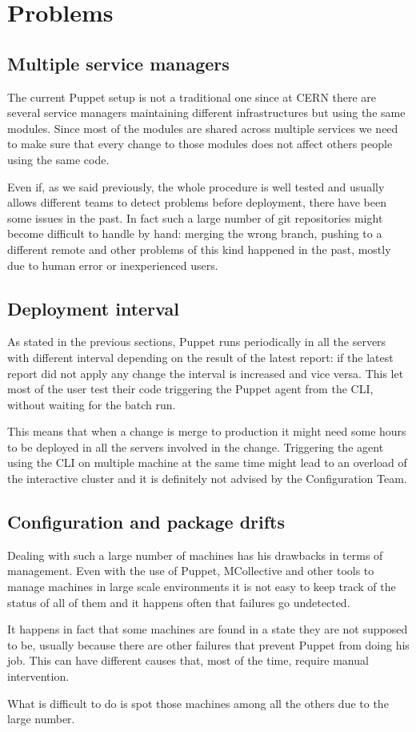 \section{Problems}

\subsection{Multiple service managers}

The current Puppet setup is not a traditional one since at CERN there are
several service managers maintaining different infrastructures but using
the same modules. Since most of the modules are shared across multiple
services we need to make sure that every change to those modules does not
affect others people using the same code.

Even if, as we said previously, the whole procedure is well tested and
usually allows different teams to detect problems before deployment, there
have been some issues in the past. In fact such a large number of git
repositories might become difficult to handle by hand: merging the wrong
branch, pushing to a different remote and other problems of this kind
happened in the past, mostly due to human error or inexperienced users.

\subsection{Deployment interval}

As stated in the previous sections, Puppet runs periodically in all the
servers with different interval depending on the result of the latest
report: if the latest report did not apply any change the interval is
increased and vice versa. This let most of the user test their code
triggering the Puppet agent from the CLI, without waiting for the batch
run.

This means that when a change is merge to production it might need some
hours to be deployed in all the servers involved in the change. Triggering
the agent using the CLI on multiple machine at the same time might lead to
an overload of the interactive cluster and it is definitely not advised
by the Configuration Team.

\subsection{Configuration and package drifts}

Dealing with such a large number of machines has his drawbacks in terms of
management. Even with the use of Puppet, MCollective and other tools to
manage machines in large scale environments it is not easy to keep track
of the status of all of them and it happens often that failures go
undetected.

It happens in fact that some machines are found in a state they are not
supposed to be, usually because there are other failures that prevent
Puppet from doing his job. This can have different causes that, most of
the time, require manual intervention.

What is difficult to do is spot those machines among all the others due to
the large number.
